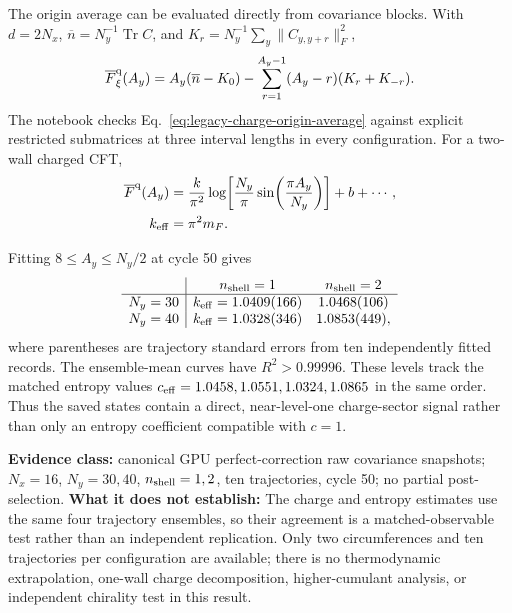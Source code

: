 \documentclass[aps,prb,twocolumn,floatfix,nofootinbib,superscriptaddress]{revtex4-2}
\newcommand{\Tr}{\operatorname{Tr}}
\newcommand{\evidence}[1]{\textbf{Evidence class:} #1}
\newcommand{\limittext}[1]{\textbf{What it does not establish:} #1}
\begin{document}
The origin average can be evaluated directly from covariance blocks.  With $d=2N_x$,
$\overline n=N_y^{-1}\Tr C$, and
$K_r=N_y^{-1}\sum_y\lVert C_{y,y+r}\rVert_F^2$,
\begin{equation}
 \overline F_{\xi}^{\rm q}(A_y)=A_y(\overline n-K_0)
 -\sum_{r=1}^{A_y-1}(A_y-r)(K_r+K_{-r}).
 \label{eq:legacy-charge-origin-average}
\end{equation}
The notebook checks Eq.~\eqref{eq:legacy-charge-origin-average} against explicit restricted
submatrices at three interval lengths in every configuration.  For a two-wall charged CFT,
\begin{equation}
 \begin{aligned}
 \overline F^{\rm q}(A_y)&=\frac{k}{\pi^2}
 \log\!\left[\frac{N_y}{\pi}\sin\!\left(\frac{\pi A_y}{N_y}\right)\right]
 +b+\cdots,\\
 k_{\rm eff}&=\pi^2m_F .
 \end{aligned}
 \label{eq:legacy-charge-level-fit}
\end{equation}

Fitting $8\leq A_y\leq N_y/2$ at cycle 50 gives
\begin{equation}
\begin{array}{c|cc}
 & n_{\rm shell}=1 & n_{\rm shell}=2\\ \hline
N_y=30 & k_{\rm eff}=1.0409(166) & 1.0468(106)\\
N_y=40 & k_{\rm eff}=1.0328(346) & 1.0853(449),
\end{array}
\label{eq:legacy-charge-level-values}
\end{equation}
where parentheses are trajectory standard errors from ten independently fitted records.
The ensemble-mean curves have $R^2>0.99996$.  These levels track the matched entropy
values $c_{\rm eff}=1.0458,1.0551,1.0324,1.0865$ in the same order.  Thus the saved
states contain a direct, near-level-one charge-sector signal rather than only an entropy
coefficient compatible with $c=1$.

\evidence{canonical GPU perfect-correction raw covariance snapshots; $N_x=16$,
$N_y=30,40$, $n_{\rm shell}=1,2$, ten trajectories, cycle 50; no partial post-selection.}
\limittext{The charge and entropy estimates use the same four trajectory ensembles, so
their agreement is a matched-observable test rather than an independent replication.
Only two circumferences and ten trajectories per configuration are available; there is no
thermodynamic extrapolation, one-wall charge decomposition, higher-cumulant analysis, or
independent chirality test in this result.}
\end{document}
